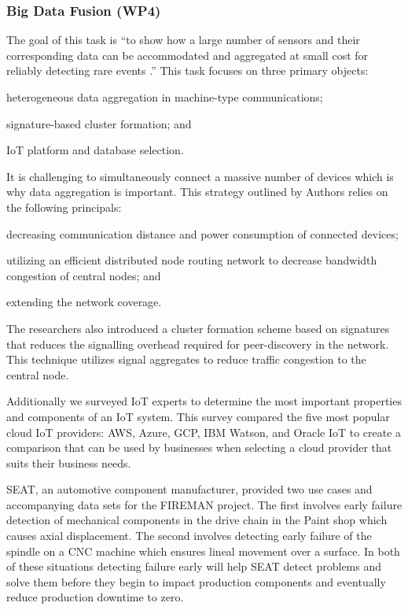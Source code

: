 \subsubsection{Big Data Fusion (WP4)}
\label{ref_wp4}
The goal of this task is \enquote{to show how a large number of sensors and their corresponding data can be  accommodated and aggregated at small cost for reliably detecting rare events \parencite{wp4.1}.} This task focuses on three primary objects: 
\begin{inlinelist}
    \item heterogeneous data aggregation in machine-type communications;
    \item signature-based cluster formation; and
    \item IoT platform and database selection.
\end{inlinelist}

It is challenging to simultaneously connect a massive number of devices which is why data aggregation is important.
This strategy outlined by Authors \cite{massive-machine} relies on the following principals:
\begin{inlinelist}
  \item decreasing communication distance and power consumption of connected devices;
  \item utilizing an efficient distributed node routing network to decrease bandwidth congestion of central nodes; and
  \item extending the network coverage.
\end{inlinelist}
The researchers also introduced a cluster formation scheme based on signatures that reduces the signalling overhead required for peer-discovery in the network. This technique utilizes signal aggregates to reduce traffic congestion to the central node.

Additionally we surveyed IoT experts to determine the most important properties and components of an IoT system. This survey compared the five most popular cloud IoT providers: AWS, Azure, GCP, IBM Watson, and Oracle IoT to create a comparison that can be used by businesses when selecting a cloud provider that suits their business needs.

SEAT, an automotive component manufacturer, provided two use cases and accompanying data sets for the FIREMAN project. The first involves early failure detection of mechanical components in the drive chain in the Paint shop which causes axial displacement. The second involves detecting early failure of the spindle on a CNC machine which ensures lineal movement over a surface. In both of these situations detecting failure early will help SEAT detect problems and solve them before they begin to impact production components and eventually reduce production downtime to zero. 

